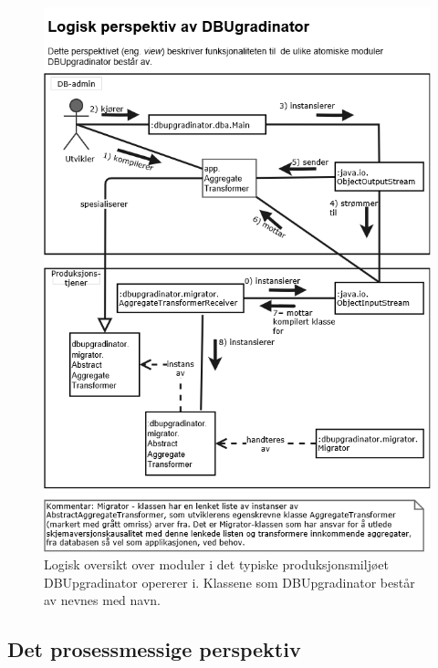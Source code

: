 \begin{figure}[!ht]
    \centering
    \includegraphics[scale=0.5]{fig/dbupgradinator-logisk-2.png}
    \caption{Logisk oversikt over moduler i det typiske produksjonsmiljøet DBUpgradinator opererer i. Klassene som DBUpgradinator består av nevnes med navn.}
    \label{fig6}
\end{figure}

\newpage

\subsection{Det prosessmessige perspektiv}

